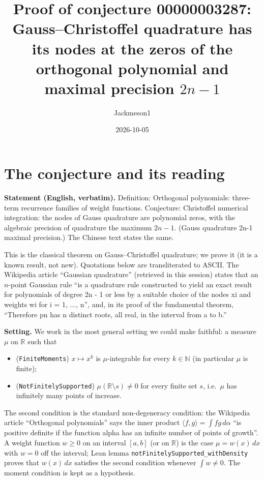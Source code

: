 \documentclass[11pt]{article}
\title{Proof of conjecture 00000003287:\\ Gauss--Christoffel quadrature has its nodes at the zeros
of the orthogonal polynomial and maximal precision $2n-1$}
\author{Jackmeson1}
\date{2026-10-05}
\theoremstyle{definition}
\newcommand{\R}{\mathbb{R}}
\begin{document}
\maketitle

\section{The conjecture and its reading}

\textbf{Statement (English, verbatim).} Definition: Orthogonal polynomials: three-term recurrence
families of weight functions. Conjecture: Christoffel numerical integration: the nodes of Gauss
quadrature are polynomial zeros, with the algebraic precision of quadrature the maximum $2n-1$.
(Gauss quadrature 2n-1 maximal precision.) The Chinese text states the same.

This is the classical theorem on Gauss--Christoffel quadrature; we prove it (it is a known result,
not new). Quotations below are transliterated to ASCII. The Wikipedia article ``Gaussian
quadrature'' (retrieved in this session) states that an
$n$-point Gaussian rule ``is a quadrature rule constructed to yield an exact result for polynomials
of degree 2n - 1 or less by a suitable choice of the nodes xi and weights wi for i = 1, ..., n'',
and, in its proof of the fundamental theorem, ``Therefore pn has n distinct roots, all real, in the
interval from a to b.''

\textbf{Setting.} We work in the most general setting we could make faithful: a measure $\mu$ on
$\R$ such that
\begin{itemize}
\item (\texttt{FiniteMoments}) $x\mapsto x^k$ is $\mu$-integrable for every $k\in\mathbb{N}$
  (in particular $\mu$ is finite);
\item (\texttt{NotFinitelySupported}) $\mu(\R\setminus s)\neq 0$ for every finite set $s$,
  i.e.\ $\mu$ has infinitely many points of increase.
\end{itemize}
The second condition is the standard non-degeneracy condition: the Wikipedia article ``Orthogonal
polynomials'' says the inner product $\langle f,g\rangle=\int fg\,d\alpha$ ``is positive definite if
the function alpha has an infinite number of points of growth''. A weight function $w\ge 0$ on an
interval $[a,b]$ (or on $\R$) is the case $\mu=w(x)\,dx$ with $w=0$ off the interval; Lean lemma
\texttt{notFinitelySupported\_withDensity} proves that $w(x)\,dx$ satisfies the second condition
whenever $\int w\neq 0$. The moment condition is kept as a hypothesis.
\end{document}

